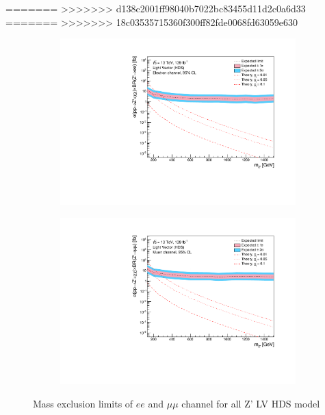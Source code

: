 \documentclass[12pt, a4paper]{book}
\begin{document}
=======
>>>>>>> d138c2001ff98040b7022bc83455d11d2c0a6d33
=======
>>>>>>> 18c03535715360f300ff82fde0068fd63059e630
\begin{figure}[!ht]
	\centering
   \begin{subfigure}[b]{0.49\textwidth}
      \centering
      \includegraphics[width=1\textwidth]{Limits/LV_HDS/mass_exclusion_ee.pdf}
      \end{subfigure}
   \hfill
   \begin{subfigure}[b]{0.49\textwidth}
      \centering
      \includegraphics[width=1\textwidth]{Limits/LV_HDS/mass_exclusion_uu.pdf}
      \end{subfigure}
   \caption{Mass exclusion limits of $ee$ and $\mu\mu$ channel for all Z' LV HDS model}\label{fig:LV_HDS_exclusion_ee_uu}
\end{figure}
\clearpage
\end{document}
